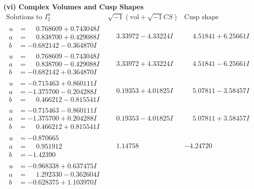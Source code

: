 \documentclass[1p]{elsarticle_modified}
\theoremstyle{definition}
\newcommand{\I}{\sqrt{-1}}
\begin{document}
\newpage\flushleft \textbf{(vi) Complex Volumes and Cusp Shapes}
$$\begin{array}{c|c|c}  
\text{Solutions to }I^u_{2}& \I (\text{vol} + \sqrt{-1}CS) & \text{Cusp shape}\\
 \hline 
\begin{aligned}
u &= \phantom{-}0.768609 + 0.743048 I \\
a &= \phantom{-}0.838700 + 0.429088 I \\
b &= -0.682142 - 0.364870 I\end{aligned}
 & \phantom{-}3.33972 - 4.33224 I & \phantom{-}4.51841 + 6.25661 I \\ \hline\begin{aligned}
u &= \phantom{-}0.768609 - 0.743048 I \\
a &= \phantom{-}0.838700 - 0.429088 I \\
b &= -0.682142 + 0.364870 I\end{aligned}
 & \phantom{-}3.33972 + 4.33224 I & \phantom{-}4.51841 - 6.25661 I \\ \hline\begin{aligned}
u &= -0.715463 + 0.860111 I \\
a &= -1.375700 - 0.204288 I \\
b &= \phantom{-}0.466212 - 0.815541 I\end{aligned}
 & \phantom{-}0.19353 + 4.01825 I & \phantom{-}5.07811 - 3.58457 I \\ \hline\begin{aligned}
u &= -0.715463 - 0.860111 I \\
a &= -1.375700 + 0.204288 I \\
b &= \phantom{-}0.466212 + 0.815541 I\end{aligned}
 & \phantom{-}0.19353 - 4.01825 I & \phantom{-}5.07811 + 3.58457 I \\ \hline\begin{aligned}
u &= -0.870665\phantom{ +0.000000I} \\
a &= \phantom{-}0.951912\phantom{ +0.000000I} \\
b &= -1.42390\phantom{ +0.000000I}\end{aligned}
 & \phantom{-}1.14758\phantom{ +0.000000I} & -4.24720\phantom{ +0.000000I} \\ \hline\begin{aligned}
u &= -0.968338 + 0.637475 I \\
a &= \phantom{-}1.292330 - 0.362604 I \\
b &= -0.628375 + 1.103970 I\end{aligned}

\end{array}$$
\end{document}
